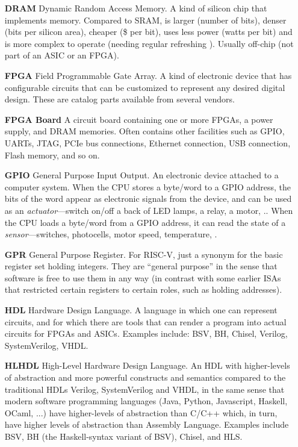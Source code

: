 \begin{itemize}
\item[\bf DRAM] Dynamic Random Access Memory.  A kind of silicon chip
  that implements memory.  Compared to SRAM, is larger (number of
  bits), denser (bits per silicon area), cheaper (\$ per bit), uses
  less power (watts per bit) and is more complex to operate (needing
  regular refreshing {\etc}). Usually off-chip (not part of an ASIC or
  an FPGA).

\item[\bf FPGA] Field Programmable Gate Array.  A kind of electronic
  device that has configurable circuits that can be customized to
  represent any desired digital design.  These are catalog parts
  available from several vendors.

\item[\bf FPGA Board] A circuit board containing one or more FPGAs, a
  power supply, and DRAM memories.  Often contains other facilities
  such as GPIO, UARTs, JTAG, PCIe bus connections, Ethernet
  connection, USB connection, Flash memory, and so on.

\item[\bf GPIO] General Purpose Input Output.  An electronic device
  attached to a computer system. When the CPU stores a byte/word to a
  GPIO address, the bits of the word appear as electronic signals from
  the device, and can be used as an \emph{actuator}---switch on/off a
  back of LED lamps, a relay, a motor, {\etc.}.  When the CPU loads a
  byte/word from a GPIO address, it can read the state of a
  \emph{sensor}---switches, photocells, motor speed, temperature,
  {\etc.}

\item[\bf GPR] General Purpose Register.  For RISC-V, just a synonym
  for the basic register set holding integers.  They are ``general
  purpose'' in the sense that software is free to use them in any way
  (in contrast with some earlier ISAs that restricted certain
  registers to certain roles, such as holding addresses).

\item[\bf HDL] Hardware Design Language.  A language in which one can
  represent circuits, and for which there are tools that can render a
  program into actual circuits for FPGAs and ASICs.  Examples include:
  BSV, BH, Chisel, Verilog, SystemVerilog, VHDL.

\item[\bf HLHDL] High-Level Hardware Design Language.  An HDL with
  higher-levels of abstraction and more powerful constructs and
  semantics compared to the traditional HDLs Verilog, SystemVerilog
  and VHDL, in the same sense that modern software programming
  languages (Java, Python, Javascript, Haskell, OCaml, ...) have
  higher-levels of abstraction than C/C++ which, in turn, have higher
  levels of abstraction than Assembly Language.  Examples include BSV,
  BH (the Haskell-syntax variant of BSV), Chisel, and HLS.


\end{itemize}
